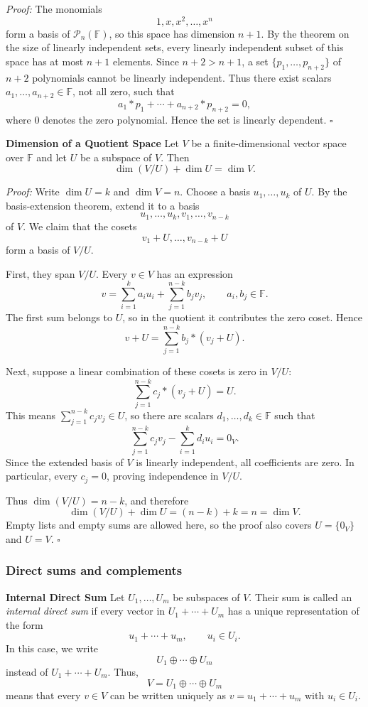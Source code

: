 \documentclass[a4paper,11pt,abstract=true]{scrartcl}
\theoremstyle{dotlessP}
\theoremstyle{dotlessS}
\theoremstyle{remark}
\theoremstyle{definition}
\begin{document}
\begin{claim_box}
\textit{Proof:} The monomials
\[
1,x,x^2,\ldots,x^n
\]
form a basis of $\mathcal{P}_n(\mathbb{F})$, so this space has dimension
$n+1$. By the theorem on the size of linearly independent sets, every
linearly independent subset of this space has at most $n+1$ elements.
Since $n+2>n+1$, a set $\{p_1,\ldots,p_{n+2}\}$ of $n+2$ polynomials
cannot be linearly independent. Thus there exist scalars
$a_1,\ldots,a_{n+2}\in\mathbb{F}$, not all zero, such that
\[
a_1*p_1+\cdots+a_{n+2}*p_{n+2}=0,
\]
where $0$ denotes the zero polynomial. Hence the set is linearly dependent.
\hfill$\square$
\end{claim_box}

\begin{problem_box}
\textbf{Dimension of a Quotient Space}
Let $V$ be a
finite-dimensional vector space over $\mathbb{F}$ and let $U$ be a subspace
of $V$. Then
\[
\dim(V/U)+\dim U=\dim V.
\]
\end{problem_box}

\begin{claim_box}
\textit{Proof:} Write $\dim U=k$ and $\dim V=n$. Choose a basis
$u_1,\ldots,u_k$ of $U$. By the basis-extension theorem,
extend it to a basis
\[
u_1,\ldots,u_k,v_1,\ldots,v_{n-k}
\]
of $V$. We claim that the cosets
\[
v_1+U,\ldots,v_{n-k}+U
\]
form a basis of $V/U$.

First, they span $V/U$. Every $v\in V$ has an expression
\[
v=\sum_{i=1}^{k}a_i u_i+\sum_{j=1}^{n-k}b_j v_j,
\qquad a_i,b_j\in\mathbb{F}.
\]
The first sum belongs to $U$, so in the quotient it contributes the zero
coset. Hence
\[
v+U=\sum_{j=1}^{n-k}b_j*(v_j+U).
\]

Next, suppose a linear combination of these cosets is zero in $V/U$:
\[
\sum_{j=1}^{n-k}c_j*(v_j+U)=U.
\]
This means $\sum_{j=1}^{n-k}c_j v_j\in U$, so there are scalars
$d_1,\ldots,d_k\in\mathbb{F}$ such that
\[
\sum_{j=1}^{n-k}c_j v_j-\sum_{i=1}^{k}d_i u_i=0_V.
\]
Since the extended basis of $V$ is linearly independent, all coefficients
are zero. In particular, every $c_j=0$, proving independence in $V/U$.

Thus $\dim(V/U)=n-k$, and therefore
\[
\dim(V/U)+\dim U=(n-k)+k=n=\dim V.
\]
Empty lists and empty sums are allowed here, so the proof also covers
$U=\{0_V\}$ and $U=V$. \hfill$\square$
\end{claim_box}

\subsubsection{Direct sums and complements}
\textbf{Internal Direct Sum} Let $U_1,\ldots,U_m$ be subspaces
of $V$. Their sum is called an \emph{internal direct sum} if every vector in
$U_1+\cdots+U_m$ has a unique representation of the form
\[
u_1+\cdots+u_m,
\qquad u_i\in U_i.
\]
In this case, we write
\[
U_1\oplus\cdots\oplus U_m
\]
instead of $U_1+\cdots+U_m$. Thus,
\[
V=U_1\oplus\cdots\oplus U_m
\]
means that every $v\in V$ can be written uniquely as
$v=u_1+\cdots+u_m$ with $u_i\in U_i$.
\end{document}

